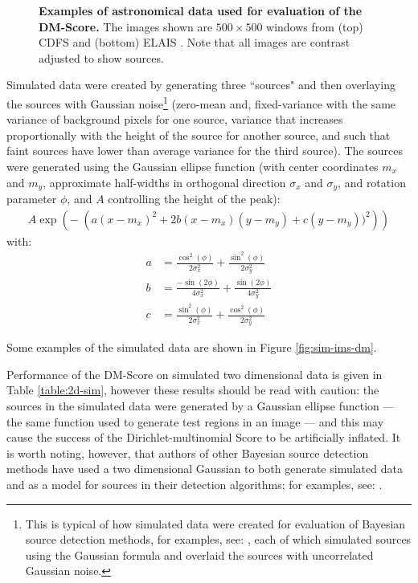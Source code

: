 \begin{figure}
\centering
{}
\caption[Astronomical images used for evaluation of the DM-Score]{\textbf{Examples of astronomical data used for evaluation of the DM-Score.} The images shown are $500 \times 500$ windows from (top) CDFS and (bottom) ELAIS \cite{norris2006deep}. Note that all images are contrast adjusted to show sources.}
\label{fig:real-data-2d}
\end{figure}

Simulated data were created by generating three ``sources" and then overlaying the sources with Gaussian noise\footnote{This is typical of how simulated data were created for evaluation of Bayesian source detection methods, for examples, see: \cite{carvalho2009fast,feroz2008multimodal,guglielmetti2009background,hobson2003bayesian,savage2007bayesian}, each of which simulated sources using the Gaussian formula and overlaid the sources with uncorrelated Gaussian noise.} (zero-mean and, fixed-variance with the same variance of background pixels for one source, variance that increases proportionally with the height of the source for another source, and such that faint sources have lower than average variance for the third source). The sources were generated using the Gaussian ellipse function (with center coordinates $m_x$ and $m_y$, approximate half-widths in orthogonal direction $\sigma_x$ and $\sigma_y$, and rotation parameter $\phi$, and $A$ controlling the height of the peak):
\begin{align}
A\exp\left(- \;\left(a(x-m_x)^2+2b(x-m_x)(y-m_y)+c(y-m_y))^2 \right) \right)\label{eq:2d-testregion}
\end{align}
with:
\begin{align}
a &= \frac{\cos^2(\phi)}{2\sigma_x^2} + \frac{\sin^2(\phi)}{2\sigma_y^2}  \\
b &= \frac{-\sin(2\phi)}{4\sigma_x^2} + \frac{\sin(2\phi)}{4\sigma_y^2}  \\
c &= \frac{\sin^2(\phi)}{2\sigma_x^2} + \frac{\cos^2(\phi)}{2\sigma_y^2} 
\end{align}

Some examples of the simulated data are shown in Figure \ref{fig:sim-ims-dm}.

Performance of the DM-Score on simulated two dimensional data is given in Table \ref{table:2d-sim}, however these results should be read with caution: the sources in the simulated data were generated by a Gaussian ellipse function --- the same function used to generate test regions in an image --- and this may cause the success of the Dirichlet-multinomial Score to be artificially inflated. It is worth noting, however, that authors of other Bayesian source detection methods have used a two dimensional Gaussian to both generate simulated data and as a model for sources in their detection algorithms; for examples, see: \cite{feroz2008multimodal,hobson2003bayesian,savage2007bayesian}.

